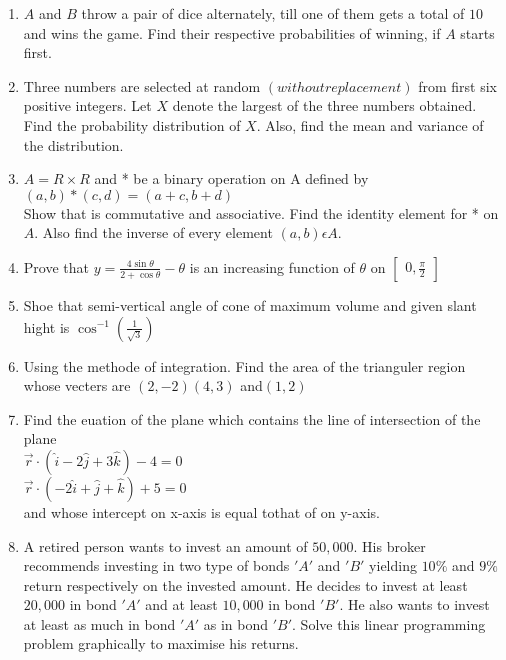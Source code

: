 \documentclass[12pt,-letter paper]{article}
\providecommand{\myvec}[1]{\ensuremath{\begin{bmatrix}#1\end{bmatrix}}}
\providecommand{\brak}[1]{\ensuremath{\left(#1\right)}}
\begin{document}
\begin{enumerate}
	

	\item  $A$ and $B$ throw a pair of dice alternately, till one of them gets a total of $10$ and wins the game. Find their respective probabilities of winning, if $A$ starts first.



	\item Three numbers are selected at random \brak{without replacement} from first six positive integers. Let $X$ denote the largest of the three numbers obtained. Find the probability distribution of $X$. Also, find the mean and variance of the distribution.

	\item $A=R \times R$ and * be a binary operation on A defined by $\brak{a,b}*\brak{c,d}=\brak{a+c,b+d}$\\
		Show that is commutative and associative. Find the identity element for * on $A$. Also find the inverse of every element $\brak{a, b} \epsilon A$.

	\item Prove that $y=\frac{4\sin{\theta}}{2+\cos{\theta}}-\theta$ is an increasing function of $\theta$ on $\myvec{0,\frac{\pi}{2}}$
	
	
	\item	Shoe that semi-vertical angle of cone of maximum volume and given slant hight is $\cos^{-1}\brak{\frac{1}{\sqrt{3}}}$
	\item Using the methode of integration. Find the area of the trianguler region whose vecters are $\brak{2, -2}\brak{4, 3}$ and$\brak{1, 2}$

\item Find the euation of the plane which contains the line of intersection of the plane \\
	$\overset\rightarrow{r}\cdot\brak{\hat{i}-2\hat{j}+3\hat{k}}-4=0$\\
	$\overset\rightarrow{r}\cdot\brak{-2\hat{	i}+\hat{j}+\hat{k}}+5=0$\\
	and whose intercept on x-axis is equal tothat of on y-axis.


	\item A retired person wants to invest an amount of \rupee $50,000$. His broker recommends investing in two type of bonds $'A'$ and $'B'$ yielding $10\%$ and $9\%$ return respectively on the invested amount. He decides to invest at least\rupee $20,000$ in bond $'A'$ and at least \rupee $10,000$ in bond $'B'$. He also wants to invest at least as much in bond $'A'$ as in bond $'B'$. Solve this linear programming problem graphically to maximise his returns.


\end{enumerate}
\end{document}
